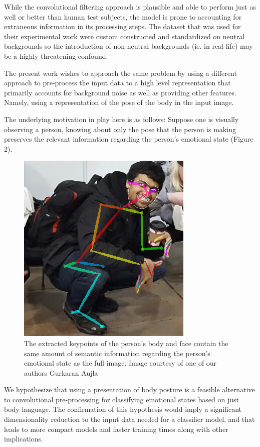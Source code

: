 \documentclass{article}
\begin{document}
While the convolutional filtering approach is plausible and able to perform just as well or better than human test subjects, the model is prone to accounting for extraneous information in its processing steps. The dataset that was used for their experimental work were custom constructed and standardized on neutral backgrounds so the introduction of non-neutral backgrounds (ie. in real life) may be a highly threatening confound.

The present work wishes to approach the same problem by using a different approach to pre-process the input data to a high level representation that primarily accounts for background noise as well as providing other features. Namely, using a representation of the pose of the body in the input image.

The underlying motivation in play here is as follows: Suppose one is visually observing a person, knowing about only the pose that the person is making preserves the relevant information regarding the person's emotional state (Figure 2).

\begin{figure}[h]
	\centering
	\includegraphics[scale=0.4]{kran}
	\caption{The extracted keypoints of the person's body and face contain the same amount of semantic information regarding the person's emotional state as the full image. Image courtesy of one of our authors Gurkaran Aujla}
\end{figure}

We hypothesize that using a presentation of body posture is a feasible alternative to convolutional pre-processing for classifying emotional states based on just body language. The confirmation of this hypothesis would imply a significant dimensionality reduction to the input data needed for a classifier model, and that leads to more compact models and faster training times along with other implications.
\end{document}
